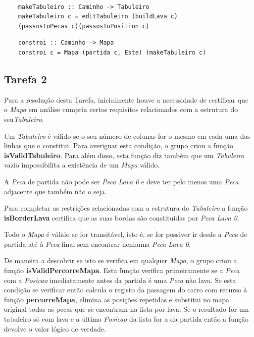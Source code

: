 \documentclass[a4paper]{report} %
\begin{document}
\begin{verbatim}
    
    makeTabuleiro :: Caminho -> Tabuleiro
    makeTabuleiro c = editTabuleiro (buildLava c)
    (passosToPecas c)(passosToPosition c)

\end{verbatim}    

\begin{verbatim}
    constroi :: Caminho -> Mapa
    constroi c = Mapa (partida c, Este) (makeTabuleiro c) 
\end{verbatim}
  

\newpage 
\subsection{Tarefa 2}
Para a resolução desta Tarefa, inicialmente houve a necessidade de certificar que o \emph{Mapa} em análise cumpria certos requisitos relacionados com a estrutura do seu\emph{Tabuleiro}.

Um \emph{Tabuleiro} é válido se o seu número de colunas for o mesmo em cada uma das linhas que o constitui. Para averiguar esta condição, o grupo criou a função \textbf{isValidTabuleiro}. Para além disso, esta função diz também que um \emph{Tabuleiro} vazio impossibilita a existência de um \emph{Mapa} válido.


A \emph{Peca} de partida não pode ser \emph{Peca Lava 0} e deve ter pelo menos uma \emph{Peca} adjacente que também não o seja.

Para completar as restrições relacionadas com a estrutura do \emph{Tabuleiro} a função \textbf{isBorderLava} certifica que as suas bordas são constituidas por \emph{Peca Lava 0}.

Todo o \emph{Mapa} é válido se for transitável, isto é, se for possiver ir desde a \emph{Peca} de partida até à \emph{Peca} final sem encontrar nenhuma \emph{Peca Lava 0}.

De maneira a descobrir se isto se verifica em qualquer \emph{Mapa}, o grupo criou a função \textbf{isValidPercorreMapa}. Esta função verifica primeiramente se a \emph{Peca} com a \emph{Posicao} imediatamente antes da partida é uma \emph{Peca} não lava. Se esta condição se verificar então  calcula o registo da passagem do carro com recurso à função \textbf{percorreMapa}, elimina as posições repetidas e substitui no mapa original todas as pecas que se encontram na lista por lava. Se o resultado for um tabuleiro só com lava e a última \emph{Posicao} da lista for a da partida então a função devolve o valor lógico de verdade.
\end{document}
